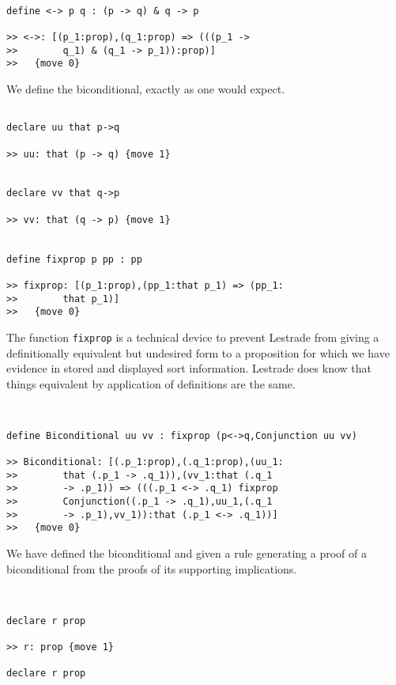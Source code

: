 \documentclass[12pt]{article}
\begin{document}
\begin{small}

\begin{verbatim}

define <-> p q : (p -> q) & q -> p

>> <->: [(p_1:prop),(q_1:prop) => (((p_1 -> 
>>        q_1) & (q_1 -> p_1)):prop)]
>>   {move 0}

\end{verbatim}

We define the biconditional, exactly as one would expect.

\begin{verbatim}

declare uu that p->q

>> uu: that (p -> q) {move 1}


declare vv that q->p

>> vv: that (q -> p) {move 1}


define fixprop p pp : pp

>> fixprop: [(p_1:prop),(pp_1:that p_1) => (pp_1:
>>        that p_1)]
>>   {move 0}

\end{verbatim}


The function {\tt fixprop} is a technical device to prevent Lestrade from giving a definitionally equivalent but undesired form to a proposition
for which we have evidence in stored and displayed sort information.  Lestrade does know that things equivalent by application of definitions are the same.

\begin{verbatim}


define Biconditional uu vv : fixprop (p<->q,Conjunction uu vv)

>> Biconditional: [(.p_1:prop),(.q_1:prop),(uu_1:
>>        that (.p_1 -> .q_1)),(vv_1:that (.q_1 
>>        -> .p_1)) => (((.p_1 <-> .q_1) fixprop 
>>        Conjunction((.p_1 -> .q_1),uu_1,(.q_1 
>>        -> .p_1),vv_1)):that (.p_1 <-> .q_1))]
>>   {move 0}

\end{verbatim}

We have defined the biconditional and given a rule generating a proof of a biconditional from the proofs of its supporting implications.

\begin{verbatim}


declare r prop

>> r: prop {move 1}

declare r prop


\end{verbatim}
\end{small}
\end{document}
